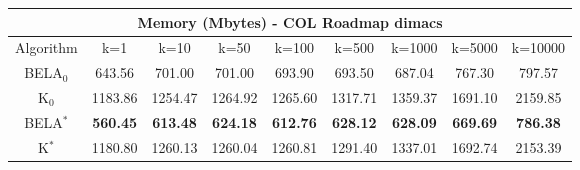 \begin{tabular}{c|cccccccc}\toprule
\multicolumn{9}{c}{Memory (Mbytes) - COL Roadmap dimacs}\\ \midrule
Algorithm & k=1 & k=10 & k=50 & k=100 & k=500 & k=1000 & k=5000 & k=10000 \\ \midrule
BELA$_0$ & 643.56 & 701.00 & 701.00 & 693.90 & 693.50 & 687.04 & 767.30 & 797.57 \\
K$_0$ & 1183.86 & 1254.47 & 1264.92 & 1265.60 & 1317.71 & 1359.37 & 1691.10 & 2159.85 \\
BELA$^*$ & \textbf{560.45} & \textbf{613.48} & \textbf{624.18} & \textbf{612.76} & \textbf{628.12} & \textbf{628.09} & \textbf{669.69} & \textbf{786.38} \\
K$^*$ & 1180.80 & 1260.13 & 1260.04 & 1260.81 & 1291.40 & 1337.01 & 1692.74 & 2153.39 \\ \bottomrule 
\end{tabular}
